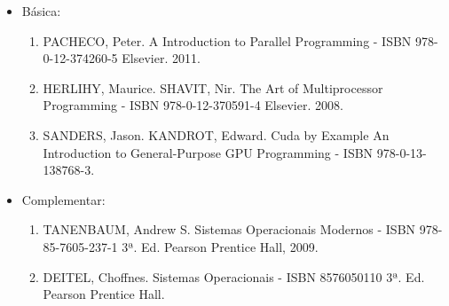 \begin{itemize} 
  \item Básica:
	\begin{enumerate}
	\item PACHECO, Peter. A Introduction to Parallel Programming - ISBN 978-0-12-374260-5 Elsevier. 2011.
	\item HERLIHY, Maurice. SHAVIT, Nir. The Art of Multiprocessor Programming - ISBN 978-0-12-370591-4 Elsevier. 2008.
	\item SANDERS, Jason. KANDROT, Edward. Cuda by Example An Introduction to General-Purpose GPU Programming - ISBN 978-0-13-138768-3.
	\end{enumerate}
  \item Complementar:
	\begin{enumerate} 
	\item  TANENBAUM, Andrew S. Sistemas Operacionais Modernos - ISBN 978-85-7605-237-1 3ª. Ed. Pearson Prentice Hall, 2009.
	\item  DEITEL, Choffnes. Sistemas Operacionais - ISBN 8576050110 3ª. Ed. Pearson Prentice Hall. 
	\end{enumerate}
\end{itemize}
